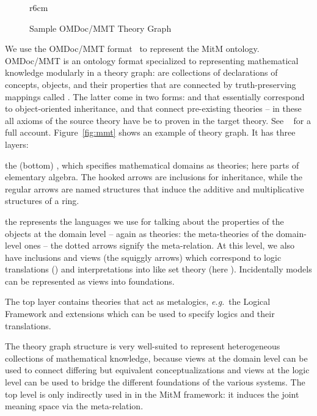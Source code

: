 \begin{wrapfigure}r{6cm}\centering\vspace*{-2em}
  \vspace*{-.5em}
  \caption{Sample OMDoc/MMT Theory Graph}\label{fig:mmt}\vspace*{-1em}
  \label{figure.omdoc.example}
\end{wrapfigure}
We use the OMDoc/MMT format~\cite{Kohlhase:OMDoc1.2,MMTSVN:on} to represent the MitM
ontology. OMDoc/MMT is an ontology format specialized to representing mathematical
knowledge modularly in a theory graph:  are collections of declarations
of concepts, objects, and their properties that are connected by truth-preserving mappings
called . The latter come in two forms:  and
 that essentially correspond to object-oriented inheritance, and
 that connect pre-existing theories -- in these all axioms of the source
theory have be to proven in the target theory. See ~\cite{RabKoh:WSMSML13} for a full
account. Figure~\ref{fig:mmt} shows an example of theory graph. It has three layers:
\begin{compactenum}[\em i\rm)]
\item the (bottom) , which specifies mathematical domains as theories; here
  parts of elementary algebra. The hooked arrows are inclusions for inheritance, while the
  regular arrows are named structures that induce the additive and multiplicative
  structures of a ring.
\item the  represents the languages we use for talking about the
  properties of the objects at the domain level -- again as theories: the meta-theories of
  the domain-level ones -- the dotted arrows signify the meta-relation. At this level, we
  also have inclusions and views (the squiggly arrows) which correspond to logic
  translations () and interpretations into  like
  set theory (here ). Incidentally models can be represented as views into
  foundations.
\item The top layer contains theories that act as metalogics, \emph{e.g.}\ the Logical Framework
   and extensions which can be used to specify logics and their translations.
\end{compactenum}
The theory graph structure is very well-suited to represent heterogeneous collections of
mathematical knowledge, because views at the domain level can be used to connect differing
but equivalent conceptualizations and views at the logic level can be used to bridge the
different foundations of the various systems. The top level is only indirectly used in in
the MitM framework: it induces the joint meaning space via the meta-relation.


